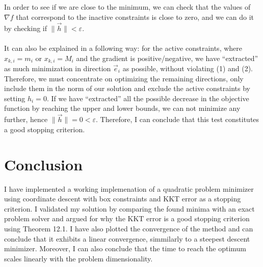 \documentclass[a4paper]{article}
\begin{document}
\subsection{}
In order to see if we are close to the minimum, we can check that the
values of $\nabla f$ that correspond to the inactive constraints is close to
zero, and we can do it by checking if $\| \vec{h} \| < \varepsilon$.\\\\
It can also be explained in a following way: for the active constraints, where
$x_{k,i} = m_i$ or $x_{k,i} = M_i$ and the gradient is positive/negative, we
have ``extracted'' as much minimization in direction $\vec{e}_i$ as possible, without
violating (1) and (2). Therefore, we must concentrate on optimizing the
remaining directions, only include them in the norm of our solution and
exclude the active constraints by setting $h_i=0$. If we have ``extracted'' all
the possible decrease in the objective function by reaching the upper and lower
bounds, we can not minimize any further, hence $\| \vec{h} \| = 0 < \varepsilon$.
Therefore, I can conclude that this test constitutes a good stopping criterion.


\section{Conclusion}
I have implemented a working implemenation of a quadratic problem minimizer
using coordinate descent with box constraints and KKT error as a stopping
criterion. I validated my solution by
comparing the found minima with an exact problem solver and argued for why the
KKT error is a good stopping criterion using Theorem 12.1. I have also plotted the
convergence of the method and can conclude that it exhibits a linear
convergence, simmilarly to a steepest descent minimizer. Moreover, I can also
conclude that the time to reach the optimum scales linearly with the problem
dimensionality.
\end{document}
